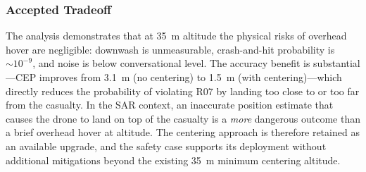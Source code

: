 \subsubsection{Accepted Tradeoff}

The analysis demonstrates that at \SI{35}{\metre} altitude the physical risks of overhead hover are negligible: downwash is unmeasurable, crash-and-hit probability is ${\sim}10^{-9}$, and noise is below conversational level. The accuracy benefit is substantial---CEP improves from \SI{3.1}{\metre} (no centering) to \SI{1.5}{\metre} (with centering)---which directly reduces the probability of violating R07 by landing too close to or too far from the casualty. In the SAR context, an inaccurate position estimate that causes the drone to land on top of the casualty is a \emph{more} dangerous outcome than a brief overhead hover at altitude. The centering approach is therefore retained as an available upgrade, and the safety case supports its deployment without additional mitigations beyond the existing \SI{35}{\metre} minimum centering altitude.
